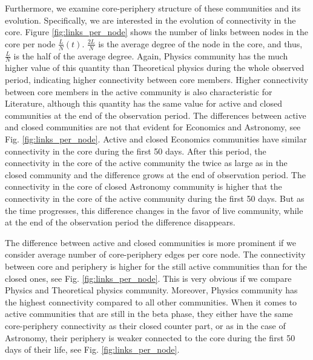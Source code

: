 Furthermore, we examine core-periphery structure of these communities and its evolution. Specifically, we are interested in the evolution of connectivity in the core. Figure \ref{fig:links_per_node} shows the number of links between nodes in the core per node $\frac{L}{N}(t)$. $\frac{2L}{N}$ is the average degree of the node in the core, and thus, $\frac{L}{N}$ is the half of the average degree. Again, Physics community has the much higher value of this quantity than Theoretical physics during the whole observed period, indicating higher connectivity between core members. Higher connectivity between core members in the active community is also characteristic for Literature, although this quantity has the same value for active and closed communities at the end of the observation period. The differences between active and closed communities are not that evident for Economics and Astronomy, see Fig. \ref{fig:links_per_node}. Active and closed Economics communities have similar connectivity in the core during the first 50 days. After this period, the connectivity in the core of the active community the twice as large as in the closed community and the difference grows at the end of observation period. The connectivity in the core of closed Astronomy community is higher that the connectivity in the core of the active community during the first 50 days. But as the time progresses, this difference changes in the favor of live community, while at the end of the observation period the difference disappears.

The difference between active and closed communities is more prominent if we consider average number of core-periphery edges per core node. The connectivity between core and periphery is higher for the still active communities than for the closed ones, see Fig. \ref{fig:links_per_node}. This is very obvious if we compare Physics and Theoretical physics community. Moreover, Physics community has the highest connectivity compared to all other communities. When it comes to active communities that are still in the beta phase, they either have the same core-periphery connectivity as their closed counter part, or as in the case of Astronomy, their periphery is weaker connected to the core during the first 50 days of their life, see Fig. \ref{fig:links_per_node}. 

